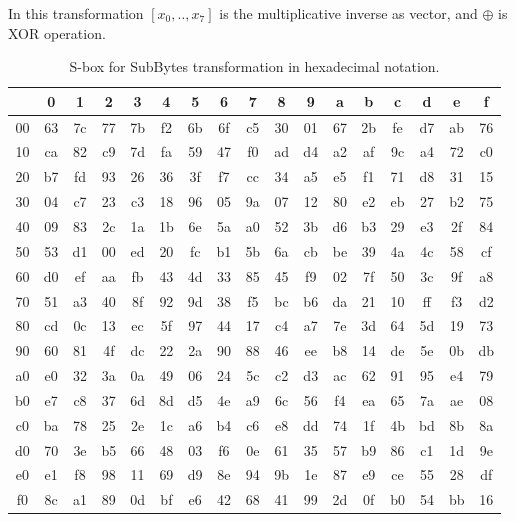 In this transformation $[x_0, .., x_7]$ is the multiplicative inverse as vector,
and $\oplus$ is XOR operation.

\begin{table}[H]
\label{sbox}
\begin{center}
\begin{tabular}{|c|cccccccccccccccc|}\hline%
      &  0 &  1 &  2 &  3 &  4 &  5 &  6 &  7 &  8 &  9 &  a &  b &  c &  d &  e &  f \\\hline
   00 & 63 & 7c & 77 & 7b & f2 & 6b & 6f & c5 & 30 & 01 & 67 & 2b & fe & d7 & ab & 76 \\ 
   10 & ca & 82 & c9 & 7d & fa & 59 & 47 & f0 & ad & d4 & a2 & af & 9c & a4 & 72 & c0 \\ 
   20 & b7 & fd & 93 & 26 & 36 & 3f & f7 & cc & 34 & a5 & e5 & f1 & 71 & d8 & 31 & 15 \\ 
   30 & 04 & c7 & 23 & c3 & 18 & 96 & 05 & 9a & 07 & 12 & 80 & e2 & eb & 27 & b2 & 75 \\ 
   40 & 09 & 83 & 2c & 1a & 1b & 6e & 5a & a0 & 52 & 3b & d6 & b3 & 29 & e3 & 2f & 84 \\ 
   50 & 53 & d1 & 00 & ed & 20 & fc & b1 & 5b & 6a & cb & be & 39 & 4a & 4c & 58 & cf \\ 
   60 & d0 & ef & aa & fb & 43 & 4d & 33 & 85 & 45 & f9 & 02 & 7f & 50 & 3c & 9f & a8 \\ 
   70 & 51 & a3 & 40 & 8f & 92 & 9d & 38 & f5 & bc & b6 & da & 21 & 10 & ff & f3 & d2 \\ 
   80 & cd & 0c & 13 & ec & 5f & 97 & 44 & 17 & c4 & a7 & 7e & 3d & 64 & 5d & 19 & 73 \\ 
   90 & 60 & 81 & 4f & dc & 22 & 2a & 90 & 88 & 46 & ee & b8 & 14 & de & 5e & 0b & db \\ 
   a0 & e0 & 32 & 3a & 0a & 49 & 06 & 24 & 5c & c2 & d3 & ac & 62 & 91 & 95 & e4 & 79 \\ 
   b0 & e7 & c8 & 37 & 6d & 8d & d5 & 4e & a9 & 6c & 56 & f4 & ea & 65 & 7a & ae & 08 \\ 
   c0 & ba & 78 & 25 & 2e & 1c & a6 & b4 & c6 & e8 & dd & 74 & 1f & 4b & bd & 8b & 8a \\ 
   d0 & 70 & 3e & b5 & 66 & 48 & 03 & f6 & 0e & 61 & 35 & 57 & b9 & 86 & c1 & 1d & 9e \\ 
   e0 & e1 & f8 & 98 & 11 & 69 & d9 & 8e & 94 & 9b & 1e & 87 & e9 & ce & 55 & 28 & df \\ 
   f0 & 8c & a1 & 89 & 0d & bf & e6 & 42 & 68 & 41 & 99 & 2d & 0f & b0 & 54 & bb & 16 \\ 
\hline
\end{tabular}
\end{center}
\caption{S-box for SubBytes transformation in hexadecimal notation.}
\end{table}

